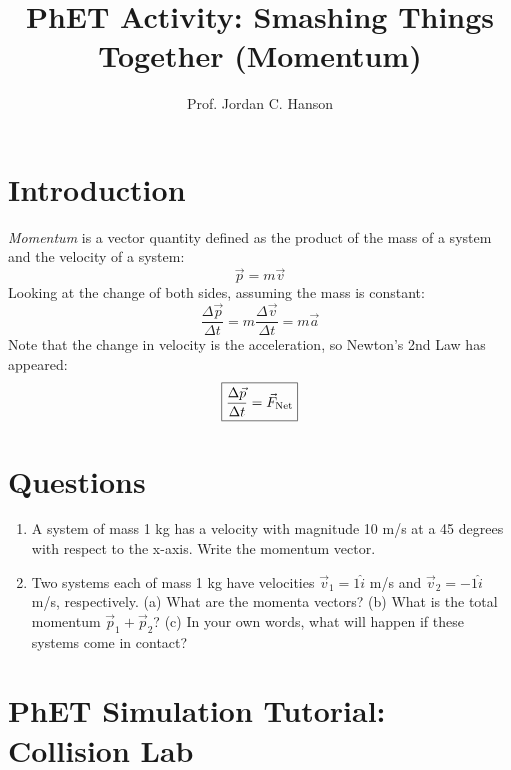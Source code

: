 \documentclass{article}
\begin{document}
\twocolumn
\small

\title{PhET Activity: Smashing Things Together (Momentum)}
\author{Prof. Jordan C. Hanson}

\maketitle

\section{Introduction}

\textit{Momentum} is a vector quantity defined as the product of the mass of a system and the velocity of a system:
\begin{equation}
\vec{p} = m\vec{v}
\end{equation}
Looking at the change of both sides, assuming the mass is constant:
\begin{equation}
\frac{\Delta\vec{p}}{\Delta t} = m \frac{\Delta\vec{v}}{\Delta t} = m\vec{a}
\end{equation}
Note that the change in velocity is the acceleration, so Newton's 2nd Law has appeared:
\begin{equation}
\boxed{
\frac{\Delta\vec{p}}{\Delta t} = \vec{F}_{\rm Net}
}
\end{equation}

\section{Questions}

\begin{enumerate}
\item A system of mass 1 kg has a velocity with magnitude 10 m/s at a 45 degrees with respect to the x-axis.  Write the momentum vector. \\ \vspace{1cm}
\item Two systems each of mass 1 kg have velocities $\vec{v}_1 = 1\hat{i}$ m/s and $\vec{v}_2 = -1\hat{i}$ m/s, respectively. (a) What are the momenta vectors? (b) What is the total momentum $\vec{p}_1 + \vec{p}_2$? (c) In your own words, what will happen if these systems come in contact? \label{q:2} \\ \vspace{2cm}
\end{enumerate}

\section{PhET Simulation Tutorial: Collision Lab}
\end{document}
